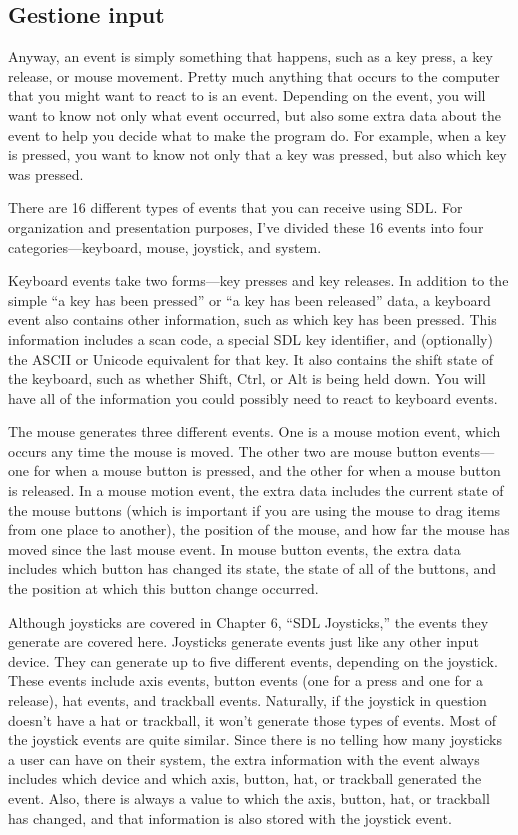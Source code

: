 \subsection{Gestione input}
Anyway, an event is simply something that happens, such as a key press, a key release, or mouse movement. Pretty much anything that occurs to the computer that you might want to react to is an event.
Depending on the event, you will want to know not only what event occurred, but also some extra data about the event to help you decide what to make the program do. For example, when a key is pressed, you want to know not only that a key was pressed, but also which key was pressed.

There are 16 different types of events that you can receive using SDL.
For organization and presentation purposes, I’ve divided these 16 events into four categories—keyboard, mouse, joystick, and system.

Keyboard events take two forms—key presses and key releases.
In addition to the simple “a key has been pressed” or “a key has been released” data, a keyboard event also contains other information, such as which key has been pressed. This information includes a scan code, a special SDL key identifier, and (optionally) the ASCII or Unicode equivalent for that key. It also contains the shift state of the keyboard, such as whether Shift, Ctrl, or Alt is being held down. You will have all of the information you could possibly need to react to keyboard events.

The mouse generates three different events. One is a mouse motion event, which occurs any time the mouse is moved. The other two are mouse button events—one for when a mouse button is pressed, and the other for when a mouse button is released.
In a mouse motion event, the extra data includes the current state of the mouse buttons (which is important if you are using the mouse to drag items from one place to another), the position of the mouse, and how far the mouse has moved since the last mouse event.
In mouse button events, the extra data includes which button has changed its state, the state of all of the buttons, and the position at which this button change occurred.

Although joysticks are covered in Chapter 6, “SDL Joysticks,” the events they generate are covered here. Joysticks generate events just like any other input device. They can generate up to five different events, depending on the joystick. These events include axis events, button events (one for a press and one for a release), hat events, and trackball events. Naturally, if the joystick in question doesn’t have a hat or trackball, it won’t generate those types of events.
Most of the joystick events are quite similar. Since there is no telling how many joysticks a user can have on their system, the extra information with the event always includes which device and which axis, button, hat, or trackball generated the event. Also, there is always a value to which the axis, button, hat, or trackball has changed, and that information is also stored with the joystick event.


